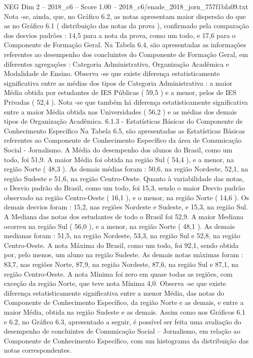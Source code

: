 \begin{textsample}{NEG Dim 2 – 2018\_c6 – Score 1.00 – 2018\_c6/enade\_2018\_jorn\_757f1bfa09.txt}
Nota -se, ainda, que, no Gráfico 6.2, as notas apresentam maior dispersão do que as no Gráfico 6.1 ( distribuição das notas da prova ), confirmado pela comparação dos desvios padrões : 14,5 para a nota da prova, como um todo, e 17,6 para o Componente de Formação Geral.
Na Tabela 6.4, são apresentadas as informações referentes ao desempenho dos concluintes do Componente de Formação Geral, em diferentes agregações : Categoria Administrativa, Organização Acadêmica e Modalidade de Ensino.
Observa -se que existe diferença estatisticamente significativa entre as médias dos tipos de Categoria Administrativa : a maior Média obtida por estudantes de IES Públicas ( 59,5 ) e a menor, pelos de IES Privadas ( 52,4 ).
Nota -se que também há diferença estatisticamente significativa entre a maior Média obtida nas Universidades ( 56,2 ) e as médias dos demais tipos de Organização Acadêmica. 6.1.3 - Estatísticas Básicas do Componente de Conhecimento Específico Na Tabela 6.5, são apresentadas as Estatísticas Básicas referentes ao Componente de Conhecimento Específico da área de Comunicação Social - Jornalismo.
A Média do desempenho dos alunos do Brasil, como um todo, foi 51,9.
A maior Média foi obtida na região Sul ( 54,4 ), e a menor, na região Norte ( 48,3 ).
As demais médias foram : 50,6, na região Nordeste, 52,1, na região Sudeste e 51,6, na região Centro-Oeste.
Quanto à variabilidade das notas, o Desvio padrão do Brasil, como um todo, foi 15,3, sendo o maior Desvio padrão observado na região Centro-Oeste ( 16,1 ), e o menor, na região Norte ( 14,6 ).
Os demais desvios foram : 15,2, nas regiões Nordeste e Sudeste, e 15,3, na região Sul.
A Mediana das notas dos estudantes de todo o Brasil foi 52,9.
A maior Mediana ocorreu na região Sul ( 56,0 ), e a menor, na região Norte ( 48,1 ).
As demais medianas foram : 51,5, na região Nordeste, 53,3, na região Sul e 52,8, na região Centro-Oeste.
A nota Máxima do Brasil, como um todo, foi 92,1, sendo obtida por, pelo menos, um aluno na região Sudeste.
As demais notas máximas foram : 83,7, nas regiões Norte, 87,9, na região Nordeste, 87,6, na região Sul e 87,1, na região Centro-Oeste.
A nota Mínima foi zero em quase todas as regiões, com exceção da região Norte, que teve nota Mínima 4,0.
Observa -se que existe diferença estatisticamente significativa entre a menor Média, das notas do Componente de Conhecimento Específico, da região Norte e as demais, e entre a maior Média, obtida na região Sudeste e as demais.
Assim como nos Gráficos 6.1 e 6.2, no Gráfico 6.3, apresentado a seguir, é possível ser feita uma avaliação do desempenho de concluintes de Comunicação Social – Jornalismo, em relação ao Componente de Conhecimento Específico, com um histograma da distribuição das notas correspondentes.

\end{textsample}
